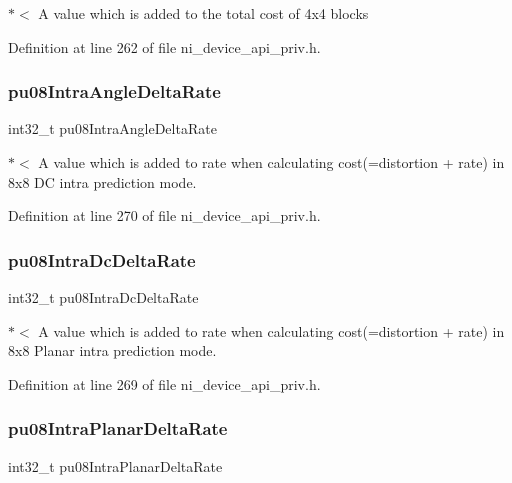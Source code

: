 $\ast$$<$ A value which is added to the total cost of 4x4 blocks 

Definition at line 262 of file ni\+\_\+device\+\_\+api\+\_\+priv.\+h.

\mbox{\label{struct__ni__t408__config__t_a12d264dcbb6ef57bbb71bf2580e59acb}} 
\subsubsection{\texorpdfstring{pu08IntraAngleDeltaRate}{pu08IntraAngleDeltaRate}}
{\footnotesize\ttfamily int32\+\_\+t pu08\+Intra\+Angle\+Delta\+Rate}

$\ast$$<$ A value which is added to rate when calculating cost(=distortion + rate) in 8x8 DC intra prediction mode. 

Definition at line 270 of file ni\+\_\+device\+\_\+api\+\_\+priv.\+h.

\mbox{\label{struct__ni__t408__config__t_a52e19be7fe3179903aad98c9b8cab70b}} 
\subsubsection{\texorpdfstring{pu08IntraDcDeltaRate}{pu08IntraDcDeltaRate}}
{\footnotesize\ttfamily int32\+\_\+t pu08\+Intra\+Dc\+Delta\+Rate}

$\ast$$<$ A value which is added to rate when calculating cost(=distortion + rate) in 8x8 Planar intra prediction mode. 

Definition at line 269 of file ni\+\_\+device\+\_\+api\+\_\+priv.\+h.

\mbox{\label{struct__ni__t408__config__t_a7854ba029610d240a307d7062c049bc6}} 
\subsubsection{\texorpdfstring{pu08IntraPlanarDeltaRate}{pu08IntraPlanarDeltaRate}}
{\footnotesize\ttfamily int32\+\_\+t pu08\+Intra\+Planar\+Delta\+Rate}

